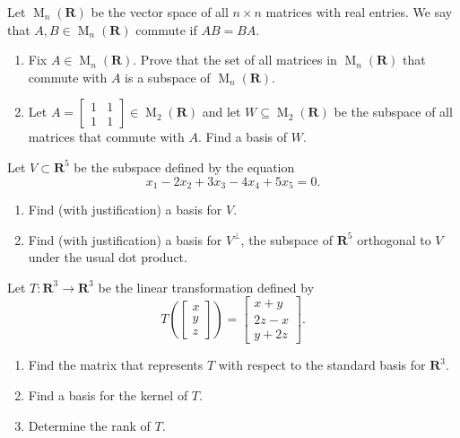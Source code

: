 \documentclass[11pt,twoside,openany]{memoir}
\begin{document}
    \begin{exercise}
    Let $\operatorname{M}_n(\mathbf{R})$ be the vector space of all $n \times n$ matrices with real entries. We say that $A, B \in \operatorname{M}_n(\mathbf{R})$ commute if $AB = BA$.
    \begin{enumerate}[label = (\arabic*)]
        \item Fix $A \in \operatorname{M}_n(\mathbf{R})$. Prove that the set of all matrices in $\operatorname{M}_n(\mathbf{R})$ that commute with $A$ is a subspace of $\operatorname{M}_n(\mathbf{R})$.
        \item Let $A=\begin{bmatrix} 1 & 1 \\ 1 & 1  \end{bmatrix}\in \operatorname{M}_2(\mathbf{R})$ and let $W\subseteq \operatorname{M}_2(\mathbf{R})$ be the subspace of all matrices that commute with $A$. Find a basis of $W$. 
    \end{enumerate}
    \end{exercise}
    
    \begin{exercise}
    Let $V\subset \mathbf{R}^5$ be the subspace defined by the equation
    \[
    x_1-2x_2+3x_3-4x_4+5x_5=0.
    \]
    \begin{enumerate}[label = (\arabic*)]
        \item Find (with justification) a basis for $V$.
        \item Find (with justification) a basis for $V^{\perp}$, the subspace of $\mathbf{R}^5$ orthogonal to $V$ under the usual dot product.
    \end{enumerate}
    \end{exercise}
    
    \newpage
    \begin{exercise}
    Let $T:\mathbf{R}^3\to \mathbf{R}^3$ be the linear transformation defined by
    \[
    T\left(\begin{bmatrix} x \\ y \\ z\end{bmatrix}\right) = \begin{bmatrix} x+y \\ 2z-x \\ y+2z\end{bmatrix}.
    \]
    \begin{enumerate}[label = (\arabic*)]
        \item Find the matrix that represents $T$ with respect to the standard basis for $\mathbf{R}^3$.
        \item Find a basis for the kernel of $T$.
        \item Determine the rank of $T$.
    \end{enumerate}
    \end{exercise}
    
\end{document}
